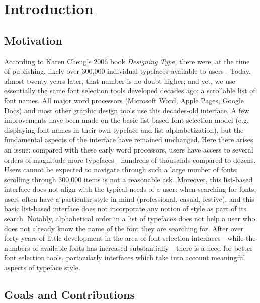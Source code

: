 \chapter{Introduction}
\label{chap:introduction}

\section{Motivation}

According to Karen Cheng's 2006 book \textit{Designing Type,} there were, at the time of publishing, likely over 300,000 individual typefaces available to users \cite{cheng2006}. Today, almost twenty years later, that number is no doubt higher; and yet, we use essentially the same font selection tools developed decades ago: a scrollable list of font names. All major word processors (Microsoft Word, Apple Pages, Google Docs) and most other graphic design tools use this decades-old interface. A few improvements have been made on the basic list-based font selection model (e.g. displaying font names in their own typeface and list alphabetization), but the fundamental aspects of the interface have remained unchanged. Here there arises an issue: compared with these early word processors, users have access to several orders of magnitude more typefaces---hundreds of thousands compared to dozens. Users cannot be expected to navigate through such a large number of fonts; scrolling through 300,000 items is not a reasonable ask. Moreover, this list-based interface does not align with the typical needs of a user: when searching for fonts, users often have a particular style in mind (professional, casual, festive), and this basic list-based interface does not incorporate any notion of style as part of its search. Notably, alphabetical order in a list of typefaces does not help a user who does not already know the name of the font they are searching for. After over forty years of little development in the area of font selection interfaces---while the numbers of available fonts has increased substantially---there is a need for better font selection tools, particularly interfaces which take into account meaningful aspects of typeface style.

\section{Goals and Contributions}

